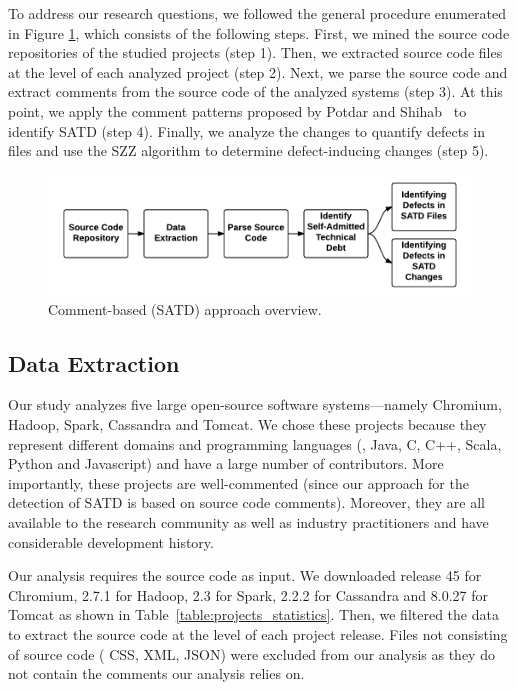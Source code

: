To address our research questions, we followed the general procedure enumerated in Figure \ref{fig:Process_overview}, which consists of the following steps. First, we mined the source code repositories of the studied projects (step 1). Then, we extracted  source code files at the level of each analyzed project (step 2). Next, we parse the source code and extract comments from the source code of the analyzed systems (step 3). At this point, we apply the comment patterns proposed by Potdar and Shihab~\cite{ICSM_PotdarS14} to identify SATD (step 4). Finally, we analyze the changes to quantify defects in files and use the SZZ algorithm to determine defect-inducing changes (step 5).


\begin{figure}[t]
	\centering
	\includegraphics[width=150mm]{figures/chapter3/approach}
	\caption{Comment-based (SATD) approach overview.}
	\label{fig:Process_overview}
\end{figure}


\subsection{Data Extraction}
Our study analyzes five large open-source software systems---namely Chromium, Hadoop, Spark, Cassandra and Tomcat. We chose these projects because they represent different domains and programming languages (\ie{}, Java, C, C++,  Scala, Python and Javascript) and have a large number of contributors. More importantly, these projects are well-commented (since our approach for the detection of SATD is based on source code comments). Moreover, they are all available to the research community as well as industry practitioners and have considerable development history.

Our analysis requires the source code as input. We downloaded release 45 for Chromium, 2.7.1 for Hadoop, 2.3 for Spark, 2.2.2 for Cassandra and 8.0.27 for Tomcat as shown in Table~\ref{table:projects_statistics}. Then, we filtered the data to extract the source code at the level of each project release. Files not consisting of source code (\eg{} CSS, XML, JSON) were excluded from our analysis as they do not contain the comments our analysis relies on.\\

